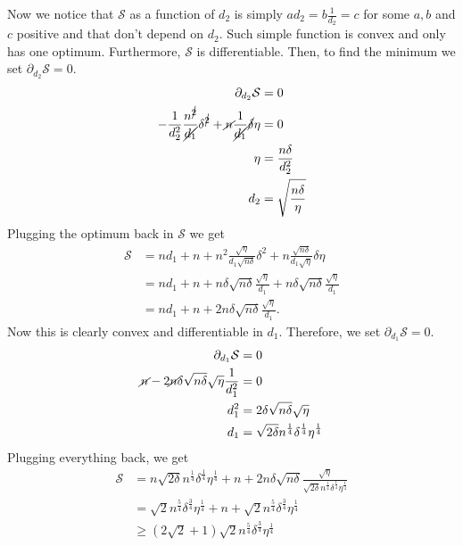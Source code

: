 \documentclass[11pt]{article}
\begin{document}
\begin{enumerate}
    Now we notice that $\mathcal{S}$ as a function of $d_2$ is simply $ad_2=b\frac{1}{d_2}=c$ for some $a,b$ and $c$ positive and that don't depend on $d_2$. Such simple function is convex and only has one optimum. Furthermore, $\mathcal{S}$ is differentiable. Then, to find the minimum we set $\partial_{d_2}\mathcal{S} = 0$.
    \begin{align*}
        \partial_{d_2}\mathcal{S} &= 0\\
        -\frac{1}{d_2^2}\frac{n^{\cancel{2}}}{\cancel{d_1}}\delta^{\cancel{2}} + \cancel{n}\frac{1}{\cancel{d_1}}\cancel{\delta}\eta&=0\\
        \eta &= \frac{n\delta}{d_2^2}\\
        d_2 &= \sqrt{\frac{n\delta}{\eta}}
    \end{align*}
    Plugging the optimum back in $\mathcal{S}$ we get 
    \begin{align*}
        \mathcal{S} &= nd_1 + n + n^2\frac{\sqrt{\eta}}{d_1\sqrt{n\delta}}\delta ^2 + n\frac{\sqrt{n\delta}}{d_1\sqrt{\eta}}\delta \eta \\
        & = nd_1 + n + n\delta \sqrt{n\delta}\frac{\sqrt{\eta}}{d_1}+ n\delta\sqrt{n\delta} \frac{\sqrt{\eta}}{d_1}\\
        & = nd_1 + n + 2n\delta \sqrt{n\delta}\frac{\sqrt{\eta}}{d_1}.
    \end{align*}
    Now this is clearly convex and differentiable in $d_1$. Therefore, we set $\partial_{d_1}\mathcal{S} = 0$. 
    \begin{align*}
        \partial_{d_1}\mathcal{S} &= 0\\
        \cancel{n} - 2\cancel{n}\delta\sqrt{n\delta}\sqrt{\eta}\frac{1}{d_1^2} &= 0\\
        d_1^2 &= 2\delta \sqrt{n\delta}\sqrt{\eta} \\
        d_1 &= \sqrt{2\delta} n^{\frac{1}{4}}\delta^{\frac{1}{4}}\eta^{\frac{1}{4}}
    \end{align*}
    Plugging everything back, we get
    \begin{align*}
        \mathcal{S} &= n\sqrt{2\delta} n^{\frac{1}{4}}\delta^{\frac{1}{4}}\eta^{\frac{1}{4}} + n + 2n\delta \sqrt{n\delta}\frac{\sqrt{\eta}}{\sqrt{2\delta} n^{\frac{1}{4}}\delta^{\frac{1}{4}}\eta^{\frac{1}{4}}}\\
        &= \sqrt{2}n^{\frac{5}{4}}\delta^{\frac{3}{4}}\eta^{\frac{1}{4}} +n+ \sqrt{2}n^{\frac{5}{4}}\delta^{\frac{3}{4}}\eta^{\frac{1}{4}}\\
        & \geq (2\sqrt{2} + 1)\sqrt{2}n^{\frac{5}{4}}\delta^{\frac{3}{4}}\eta^{\frac{1}{4}} \\

\end{align*}
\end{enumerate}
\end{document}
